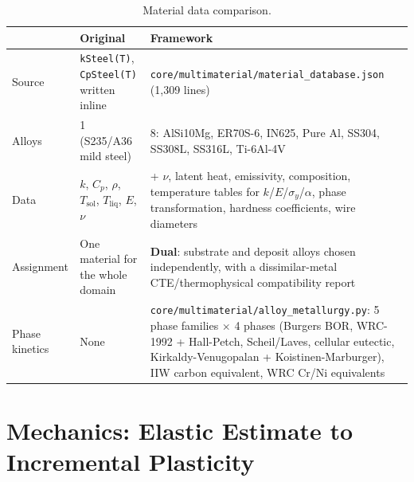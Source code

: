 \documentclass[10pt,a4paper]{article}
\newcommand{\code}[1]{\texttt{#1}}
\newcommand{\file}[1]{\texttt{\small #1}}
\begin{document}
\begin{table}[h!]
\centering
\caption{Material data comparison.}
\label{tab:mat}
\small
\begin{tabularx}{\linewidth}{@{}l X X@{}}
\toprule
& \textbf{Original} & \textbf{Framework} \\
\midrule
Source & \code{kSteel(T)}, \code{CpSteel(T)} written inline &
\file{core/multimaterial/material\_database.json} (1{,}309 lines) \\
\addlinespace
Alloys & 1 (S235/A36 mild steel) & 8: AlSi10Mg, ER70S-6, IN625, Pure Al,
SS304, SS308L, SS316L, Ti-6Al-4V \\
\addlinespace
Data & $k$, $C_p$, $\rho$, $T_{\text{sol}}$, $T_{\text{liq}}$, $E$, $\nu$ &
+ $\nu$, latent heat, emissivity, composition, temperature tables for
$k$/$E$/$\sigma_y$/$\alpha$, phase transformation, hardness coefficients, wire
diameters \\
\addlinespace
Assignment & One material for the whole domain & \textbf{Dual}: substrate and
deposit alloys chosen independently, with a dissimilar-metal
CTE/thermophysical compatibility report \\
\addlinespace
Phase kinetics & None & \file{core/multimaterial/alloy\_metallurgy.py}: 5
phase families $\times$ 4 phases (Burgers BOR, WRC-1992 + Hall-Petch,
Scheil/Laves, cellular eutectic, Kirkaldy-Venugopalan + Koistinen-Marburger),
IIW carbon equivalent, WRC Cr/Ni equivalents \\
\bottomrule
\end{tabularx}
\end{table}

\section{Mechanics: Elastic Estimate to Incremental Plasticity}
\end{document}
